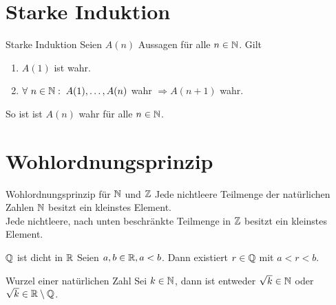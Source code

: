 \documentclass[main.tex]{subfiles}
\begin{document}
\section*{Starke Induktion}
\begin{karte}{Starke Induktion}
    Seien \(A(n) \) Aussagen für alle \(n \in \mathbb{N} \). Gilt
	\begin{enumerate}
		\item \(A(1) \) ist wahr.
        \item \(\forall \, n \in \N: \; A(1), \ldots, A(n) \) wahr 
        \(\Rightarrow A(n + 1) \) wahr.
	\end{enumerate}
	So ist ist \(A(n) \) wahr für alle \(n \in \mathbb{N} \).
\end{karte}
\section*{Wohlordnungsprinzip}
\begin{karte}{Wohlordnungsprinzip für \( \mathbb{N} \) und \( \mathbb{Z} \)}
    Jede nichtleere Teilmenge der 
    natürlichen Zahlen \(\mathbb{N} \) 
    besitzt ein kleinstes Element.\\
    Jede nichtleere, nach unten 
    beschränkte Teilmenge in \( \mathbb{Z} \) 
    besitzt ein kleinstes Element.
\end{karte}
\begin{karte}{\(\mathbb{Q}\) ist dicht in \(\mathbb{R}\)}
    Seien \(a, b \in \mathbb{R}, a < b \). 
    Dann existiert \( r \in \mathbb{Q} \) mit \(a < r < b \).
\end{karte}
\begin{karte}{Wurzel einer natürlichen Zahl}
    Sei \(k \in \mathbb{N} \), dann ist entweder 
    \(\sqrt{k} \in \mathbb{N} \) oder \(\sqrt{k} \in \mathbb{R} \setminus \mathbb{Q} \).
\end{karte}
\end{document}
